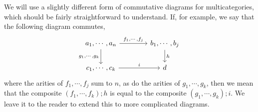 \begin{remark}
  We will use a slightly different form of commutative diagrams for multicategories, which should be fairly straightforward to understand.
  If, for example, we say that the following diagram commutes,
  \[
    \begin{tikzcd}[column sep=40pt]
      {a_1,\cdots,a_n} \arrow[r, "{f_1,\cdots,f_j}"] \arrow[d, "{g_1,\cdots,g_k}"']
        & {b_1,\cdots,b_j} \arrow[d, "h"] \\
      {c_1,\cdots,c_k} \arrow[r, "i"]
        & d
    \end{tikzcd}
    \]
  where the arities of $f_1,\cdots,f_j$ sum to $n$, as do the arities of $g_1,\cdots,g_k$, then we mean that the composite $(f_1,\cdots,f_k);h$ is equal to the composite $(g_1,\cdots,g_k);i$.
  We leave it to the reader to extend this to more complicated diagrams.
\end{remark}

